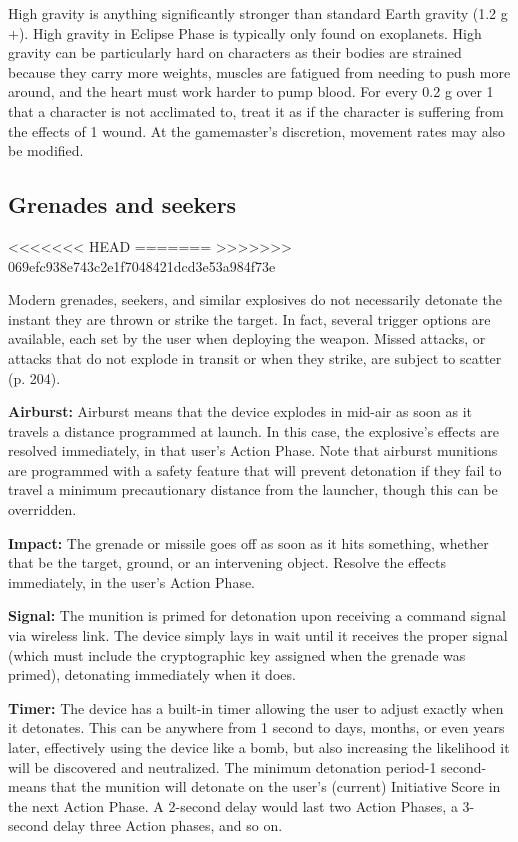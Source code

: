 High gravity is anything significantly stronger than standard Earth gravity (1.2 g +). High gravity in Eclipse Phase is typically only found on exoplanets. High gravity can be particularly hard on characters as their bodies are strained because they carry more weights, muscles are fatigued from needing to push more around, and the heart must work harder to pump blood. For every 0.2 g over 1 that a character is not acclimated to, treat it as if the character is suffering from the effects of 1 wound. At the gamemaster’s discretion, movement rates may also be modified.

\subsection{Grenades and seekers}
<<<<<<< HEAD
\label{sec:grenades-seekers}
=======
\label{sec:combat-grenades-seekers}
>>>>>>> 069efc938e743c2e1f7048421dcd3e53a984f73e

Modern grenades, seekers, and similar explosives do not necessarily detonate the instant they are thrown or strike the target. In fact, several trigger options are available, each set by the user when deploying the weapon. Missed attacks, or attacks that do not explode in transit or when they strike, are subject to scatter (p. 204).

\textbf{Airburst:} Airburst means that the device explodes in mid-air as soon as it travels a distance programmed at launch. In this case, the explosive’s effects are resolved immediately, in that user’s Action Phase. Note that airburst munitions are programmed with a safety feature that will prevent detonation if they fail to travel a minimum precautionary distance from the launcher, though this can be overridden.

\textbf{Impact:} The grenade or missile goes off as soon as it hits something, whether that be the target, ground, or an intervening object. Resolve the effects immediately, in the user’s Action Phase.

\textbf{Signal:} The munition is primed for detonation upon receiving a command signal via wireless link. The device simply lays in wait until it receives the proper signal (which must include the cryptographic key assigned when the grenade was primed), detonating immediately when it does.

\textbf{Timer:} The device has a built-in timer allowing the user to adjust exactly when it detonates. This can be anywhere from 1 second to days, months, or even years later, effectively using the device like a bomb, but also increasing the likelihood it will be discovered and neutralized. The minimum detonation period-1 second-means that the munition will detonate on the user’s (current) Initiative Score in the next Action Phase. A 2-second delay would last two Action Phases, a 3-second delay three Action phases, and so on.

